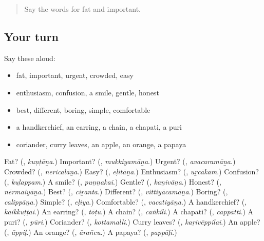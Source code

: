 \label{lesson:TA-R271-second-pass-words-from-chapters-267-271}



\begin{quote}
Say the words for fat and important.
\end{quote}

\subsection*{Your turn}
Say these aloud:

\begin{itemize}
\raggedright
  \item fat, important, urgent, crowded, easy
  \item enthusiasm, confusion, a smile, gentle, honest
  \item best, different, boring, simple, comfortable
  \item a handkerchief, an earring, a chain, a chapati, a puri
  \item coriander, curry leaves, an apple, an orange, a papaya
\end{itemize}

\begin{tcolorbox}[breakable,colback=teal!4,colframe=teal!35!black,title={Before you move on}]
Fat? (\textbf{}, \emph{kuṇṭāṉa}.) Important? (\textbf{}, \emph{mukkiyamāṉa}.) Urgent? (\textbf{}, \emph{avacaramāṉa}.) Crowded? (\textbf{}, \emph{nericalāṉa}.) Easy? (\textbf{}, \emph{eḷitāṉa}.) Enthusiasm? (\textbf{}, \emph{uṟcākam}.) Confusion? (\textbf{}, \emph{kuḻappam}.) A smile? (\textbf{}, \emph{puṉṉakai}.) Gentle? (\textbf{}, \emph{kaṉivāṉa}.) Honest? (\textbf{}, \emph{nērmaiyāṉa}.) Best? (\textbf{}, \emph{ciṟanta}.) Different? (\textbf{}, \emph{vittiyācamāṉa}.) Boring? (\textbf{}, \emph{calippāṉa}.) Simple? (\textbf{}, \emph{eḷiya}.) Comfortable? (\textbf{}, \emph{vacatiyāṉa}.) A handkerchief? (\textbf{}, \emph{kaikkuṭṭai}.) An earring? (\textbf{}, \emph{tōṭu}.) A chain? (\textbf{}, \emph{caṅkili}.) A chapati? (\textbf{}, \emph{cappātti}.) A puri? (\textbf{}, \emph{pūri}.) Coriander? (\textbf{}, \emph{kottamalli}.) Curry leaves? (\textbf{}, \emph{kaṟivēppilai}.) An apple? (\textbf{}, \emph{āppiḷ}.) An orange? (\textbf{}, \emph{ārañcu}.) A papaya? (\textbf{}, \emph{pappāḷi}.)
\end{tcolorbox}
